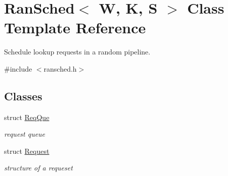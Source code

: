 \hypertarget{classRanSched}{\section{Ran\-Sched$<$ W, K, S $>$ Class Template Reference}
\label{classRanSched}
}


Schedule lookup requests in a random pipeline.  




{\ttfamily \#include $<$ransched.\-h$>$}

\subsection*{Classes}
\begin{DoxyCompactItemize}
\item 
struct \hyperlink{structRanSched_1_1ReqQue}{Req\-Que}
\begin{DoxyCompactList}\small\item\em request queue \end{DoxyCompactList}\item 
struct \hyperlink{structRanSched_1_1Request}{Request}
\begin{DoxyCompactList}\small\item\em structure of a requeset \end{DoxyCompactList}\end{DoxyCompactItemize}
